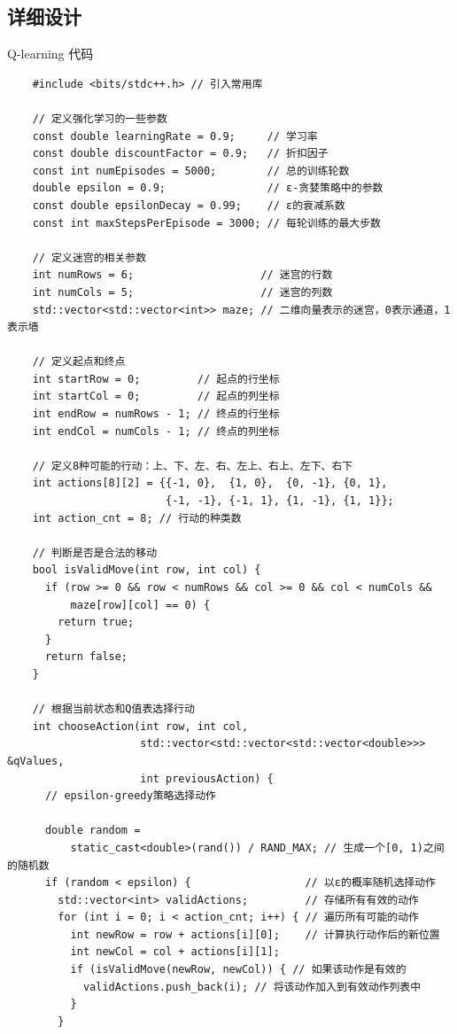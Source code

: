 \documentclass[UTF8,titlepage]{ctexart}
\numberwithin{figure}{section}
\begin{document}
\subsection{详细设计}
Q-learning 代码
\begin{verbatim}
    #include <bits/stdc++.h> // 引入常用库

    // 定义强化学习的一些参数
    const double learningRate = 0.9;     // 学习率
    const double discountFactor = 0.9;   // 折扣因子
    const int numEpisodes = 5000;        // 总的训练轮数
    double epsilon = 0.9;                // ε-贪婪策略中的参数
    const double epsilonDecay = 0.99;    // ε的衰减系数
    const int maxStepsPerEpisode = 3000; // 每轮训练的最大步数
    
    // 定义迷宫的相关参数
    int numRows = 6;                    // 迷宫的行数
    int numCols = 5;                    // 迷宫的列数
    std::vector<std::vector<int>> maze; // 二维向量表示的迷宫，0表示通道，1表示墙
    
    // 定义起点和终点
    int startRow = 0;         // 起点的行坐标
    int startCol = 0;         // 起点的列坐标
    int endRow = numRows - 1; // 终点的行坐标
    int endCol = numCols - 1; // 终点的列坐标
    
    // 定义8种可能的行动：上、下、左、右、左上、右上、左下、右下
    int actions[8][2] = {{-1, 0},  {1, 0},  {0, -1}, {0, 1},
                         {-1, -1}, {-1, 1}, {1, -1}, {1, 1}};
    int action_cnt = 8; // 行动的种类数
    
    // 判断是否是合法的移动
    bool isValidMove(int row, int col) {
      if (row >= 0 && row < numRows && col >= 0 && col < numCols &&
          maze[row][col] == 0) {
        return true;
      }
      return false;
    }
    
    // 根据当前状态和Q值表选择行动
    int chooseAction(int row, int col,
                     std::vector<std::vector<std::vector<double>>> &qValues,
                     int previousAction) {
      // epsilon-greedy策略选择动作
    
      double random =
          static_cast<double>(rand()) / RAND_MAX; // 生成一个[0, 1)之间的随机数
      if (random < epsilon) {                  // 以ε的概率随机选择动作
        std::vector<int> validActions;         // 存储所有有效的动作
        for (int i = 0; i < action_cnt; i++) { // 遍历所有可能的动作
          int newRow = row + actions[i][0];    // 计算执行动作后的新位置
          int newCol = col + actions[i][1];
          if (isValidMove(newRow, newCol)) { // 如果该动作是有效的
            validActions.push_back(i); // 将该动作加入到有效动作列表中
          }
        }
    

\end{verbatim}
\end{document}
